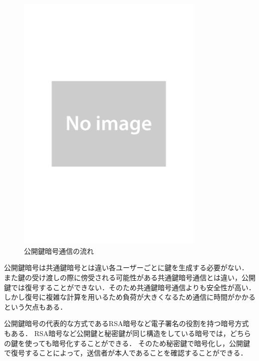 \documentclass[a4j,12pt]{jsarticle}
\begin{document}
\begin{figure}[H]
\centering
\includegraphics[width=9cm]{noimage.pdf}
\caption{公開鍵暗号通信の流れ}
\label{fig:no}
\end{figure} 

公開鍵暗号は共通鍵暗号とは違い各ユーザーごとに鍵を生成する必要がない．
また鍵の受け渡しの際に傍受される可能性がある共通鍵暗号通信とは違い，公開鍵では復号することができない．そのため共通鍵暗号通信よりも安全性が高い．しかし復号に複雑な計算を用いるため負荷が大きくなるため通信に時間がかかるという欠点もある．


公開鍵暗号の代表的な方式であるRSA暗号など電子署名の役割を持つ暗号方式もある．
RSA暗号など公開鍵と秘密鍵が同じ構造をしている暗号では，どちらの鍵を使っても暗号化することができる．
そのため秘密鍵で暗号化し，公開鍵で復号することによって，送信者が本人であることを確認することができる．
\end{document}
